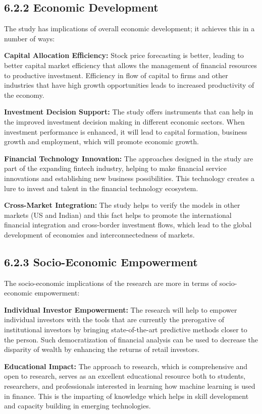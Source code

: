 \documentclass[12pt,a4paper]{report}
\begin{document}
\subsection{6.2.2 Economic Development}
The study has implications of overall economic development; it achieves this in a number of ways:

\textbf{Capital Allocation Efficiency:} Stock price forecasting is better, leading to better capital market efficiency that allows the management of financial resources to productive investment. Efficiency in flow of capital to firms and other industries that have high growth opportunities leads to increased productivity of the economy.

\textbf{Investment Decision Support:} The study offers instruments that can help in the improved investment decision making in different economic sectors. When investment performance is enhanced, it will lead to capital formation, business growth and employment, which will promote economic growth.

\textbf{Financial Technology Innovation:} The approaches designed in the study are part of the expanding fintech industry, helping to make financial service innovations and establishing new business possibilities. This technology creates a lure to invest and talent in the financial technology ecosystem.

\textbf{Cross-Market Integration:} The study helps to verify the models in other markets (US and Indian) and this fact helps to promote the international financial integration and cross-border investment flows, which lead to the global development of economies and interconnectedness of markets.

\subsection{6.2.3 Socio-Economic Empowerment}
The socio-economic implications of the research are more in terms of socio-economic empowerment:

\textbf{Individual Investor Empowerment:} The research will help to empower individual investors with the tools that are currently the prerogative of institutional investors by bringing state-of-the-art predictive methods closer to the person. Such democratization of financial analysis can be used to decrease the disparity of wealth by enhancing the returns of retail investors.

\textbf{Educational Impact:} The approach to research, which is comprehensive and open to research, serves as an excellent educational resource both to students, researchers, and professionals interested in learning how machine learning is used in finance. This is the imparting of knowledge which helps in skill development and capacity building in emerging technologies.
\end{document}
